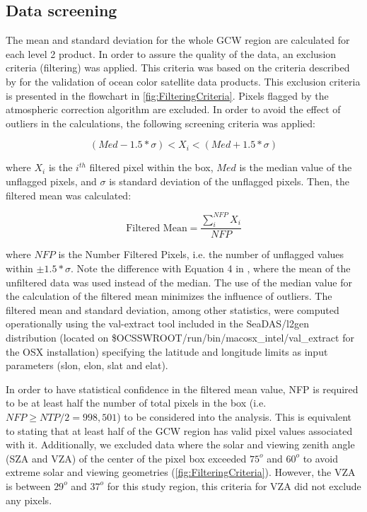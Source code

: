 \documentclass[onecolumn,3p,letterpaper,11pt]{elsarticle}
\begin{document}
\subsection{Data screening}
The mean and standard deviation for the whole GCW region are calculated for each level 2 product. In order to assure the quality of the data, an exclusion criteria (filtering) was applied. This criteria was based on the criteria described by \citet{Bailey2006} for the validation of ocean color satellite data products. This exclusion criteria is presented in the flowchart in \autoref{fig:FilteringCriteria}. Pixels flagged by the atmospheric correction algorithm are excluded. In order to avoid the effect of outliers in the calculations, the following screening criteria was applied:
\begin{linenomath*}
\begin{equation}\label{eq:filtered_value}
  (Med-1.5*\sigma) <  X_i < (Med+1.5*\sigma)
\end{equation}
\end{linenomath*}
where $X_i$ is the $i^{th}$ filtered pixel within the box, $Med$ is the median value of the unflagged pixels, and $\sigma$ is standard deviation of the unflagged pixels. Then, the filtered mean was calculated:
\begin{linenomath*}
\begin{equation}\label{eq:filtered_mean}
  \text{Filtered Mean} =\frac{\displaystyle \sum_i^{NFP} X_i}{NFP}
\end{equation}
\end{linenomath*}
where $NFP$ is the Number Filtered Pixels, i.e. the number of unflagged values within $\pm 1.5*\sigma$. Note the difference with Equation 4 in \citet{Bailey2006}, where the mean of the unfiltered data was used instead of the median. The use of the median value for the calculation of the filtered mean minimizes the influence of outliers. The filtered mean and standard deviation, among other statistics, were computed operationally using the val-extract tool included in the SeaDAS/l2gen distribution (located on {\ttfamily \$OCSSWROOT/run/bin/macosx\_intel/val\_extract}  for the OSX installation) specifying the latitude and longitude limits as input parameters (slon, elon, slat and elat).

In order to have statistical confidence in the filtered mean value, NFP is required to be at least half the number of total pixels in the box (i.e. $NFP\geq NTP/2 = 998,501$) to be considered into the analysis. This is equivalent to stating that at least half of the GCW region has valid pixel values associated with it. Additionally, we excluded data where the solar and viewing zenith angle (SZA and VZA) of the center of the pixel box exceeded $75^o$ and $60^o$ to avoid extreme solar and  viewing geometries \citep{Bailey2006} (\autoref{fig:FilteringCriteria}). However, the VZA is between $29^o$ and $37^o$ for this study region, this criteria for VZA did not exclude any pixels.
\end{document}
